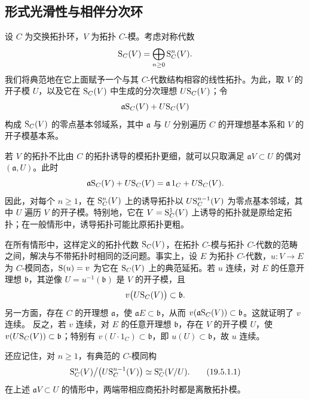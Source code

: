 \subsection{形式光滑性与相伴分次环}
设 $C$ 为交换拓扑环，$V$ 为拓扑 $C$-模。考虑对称代数
\[
 \mathrm S_C(V)=\bigoplus_{n\geq0}\mathrm S_C^n(V).
\]
我们将典范地在它上面赋予一个与其 $C$-代数结构相容的线性拓扑。为此，取 $V$ 的开子模 $U$，以及它在 $\mathrm S_C(V)$ 中生成的分次理想 $U\mathrm S_C(V)$；令
\[
 \mathfrak a\mathrm S_C(V)+U\mathrm S_C(V)
\]
构成 $\mathrm S_C(V)$ 的零点基本邻域系，其中 $\mathfrak a$ 与 $U$ 分别遍历 $C$ 的开理想基本系和 $V$ 的开子模基本系。

若 $V$ 的拓扑不比由 $C$ 的拓扑诱导的模拓扑更细，就可以只取满足 $\mathfrak aV\subset U$ 的偶对 $(\mathfrak a,U)$。此时
\[
 \mathfrak a\mathrm S_C(V)+U\mathrm S_C(V)
   =\mathfrak a\,1_C+U\mathrm S_C(V).
\]
因此，对每个 $n\geq1$，在 $\mathrm S_C^n(V)$ 上的诱导拓扑以 $U\mathrm S_C^{n-1}(V)$ 为零点基本邻域，其中 $U$ 遍历 $V$ 的开子模。特别地，它在 $V=\mathrm S_C^1(V)$ 上诱导的拓扑就是原给定拓扑；在一般情形中，诱导拓扑可能比原拓扑更粗。

在所有情形中，这样定义的拓扑代数 $\mathrm S_C(V)$，在拓扑 $C$-模与拓扑 $C$-代数的范畴之间，解决与不带拓扑时相同的泛问题。事实上，设 $E$ 为拓扑 $C$-代数，$u:V\to E$ 为 $C$-模同态，$\mathrm S(u)=v$ 为它在 $\mathrm S_C(V)$ 上的典范延拓。若 $u$ 连续，对 $E$ 的任意开理想 $\mathfrak b$，其逆像 $U=u^{-1}(\mathfrak b)$ 是 $V$ 的开子模，且
\[
 v\bigl(U\mathrm S_C(V)\bigr)\subset\mathfrak b.
\]
另一方面，存在 $C$ 的开理想 $\mathfrak a$，使 $\mathfrak aE\subset\mathfrak b$，从而
$v(\mathfrak a\mathrm S_C(V))\subset\mathfrak b$。这就证明了 $v$ 连续。
反之，若 $v$ 连续，对 $E$ 的任意开理想 $\mathfrak b$，存在 $V$ 的开子模 $U$，使
$v(U\mathrm S_C(V))\subset\mathfrak b$；特别有 $v(U\cdot1_C)\subset\mathfrak b$，即 $u(U)\subset\mathfrak b$，故 $u$ 连续。

还应记住，对 $n\geq1$，有典范的 $C$-模同构
\begin{equation}
 \mathrm S_C^n(V)\big/\bigl(U\mathrm S_C^{n-1}(V)\bigr)
       \simeq\mathrm S_C^n(V/U).
 \tag{19.5.1.1}
\end{equation}
在上述 $\mathfrak aV\subset U$ 的情形中，两端带相应商拓扑时都是离散拓扑模。

